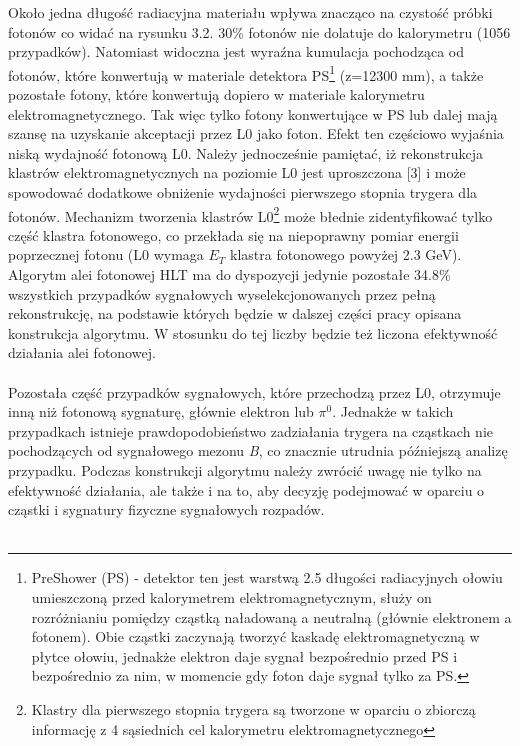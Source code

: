 \documentclass{pracamgr}
\begin{document}
\noindent
Około jedna długość radiacyjna materiału wpływa znacząco na czystość próbki fotonów co widać na rysunku 3.2. 30\% fotonów nie dolatuje do kalorymetru (1056 przypadków). Natomiast widoczna jest wyraźna kumulacja pochodząca od fotonów, które konwertują w materiale detektora PS\footnote{PreShower (PS) - detektor ten jest warstwą 2.5 długości radiacyjnych ołowiu umieszczoną przed kalorymetrem elektromagnetycznym, służy on rozróżnianiu pomiędzy cząstką naładowaną a neutralną (głównie elektronem a fotonem). Obie cząstki zaczynają tworzyć kaskadę elektromagnetyczną w płytce ołowiu, jednakże elektron daje sygnał bezpośrednio przed PS i bezpośrednio za nim, w momencie gdy foton daje sygnał tylko za PS.} (z=12300 mm), a także pozostałe fotony, które konwertują dopiero w materiale kalorymetru elektromagnetycznego. Tak więc tylko fotony konwertujące w PS lub dalej mają szansę na uzyskanie akceptacji przez L0 jako foton. Efekt ten częściowo wyjaśnia niską wydajność fotonową L0. Należy jednocześnie pamiętać, iż rekonstrukcja klastrów elektromagnetycznych na poziomie L0 jest uproszczona [3] i może spowodować dodatkowe obniżenie wydajności pierwszego stopnia trygera dla fotonów. Mechanizm tworzenia klastrów L0\footnote{Klastry dla pierwszego stopnia trygera są tworzone w oparciu o zbiorczą informację z 4 sąsiednich cel kalorymetru elektromagnetycznego} może błednie zidentyfikować tylko część klastra fotonowego, co przekłada się na niepoprawny pomiar energii poprzecznej fotonu (L0 wymaga $E_T$ klastra fotonowego powyżej 2.3 GeV). Algorytm alei fotonowej HLT ma do dyspozycji jedynie pozostałe 34.8\% wszystkich przypadków sygnałowych wyselekcjonowanych przez pełną rekonstrukcję, na podstawie których będzie w dalszej części pracy opisana konstrukcja algorytmu. W stosunku do tej liczby będzie też liczona efektywność działania alei fotonowej.
\\\\
\noindent
Pozostała część przypadków sygnałowych, które przechodzą przez L0, otrzymuje inną niż fotonową sygnaturę, głównie elektron lub $\pi^0$. Jednakże w takich przypadkach istnieje prawdopodobieństwo zadziałania trygera na cząstkach nie pochodzących od sygnałowego mezonu \textit{B}, co znacznie utrudnia późniejszą analizę przypadku. Podczas konstrukcji algorytmu należy zwrócić uwagę nie tylko na efektywność działania, ale także i na to, aby decyzję podejmować w oparciu o cząstki i sygnatury fizyczne sygnałowych rozpadów.
\\\\
\noindent
\end{document}
